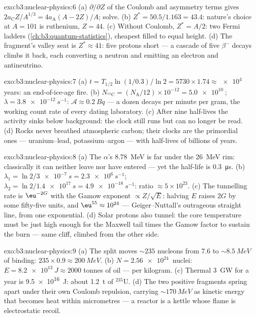 \begin{solution}{exo:b3:nuclear-physics:6}
(a) $\partial/\partial Z$ of the Coulomb and asymmetry terms
gives $2a_{\text{C}}Z/A^{1/3} = 4a_{\text{A}}(A - 2Z)/A$; solve.
(b) $Z^* = 50.5/1.163 = 43.4$: nature's choice at $A = 101$ is
ruthenium, $Z = 44$. (c) Without Coulomb, $Z^* = A/2$: two Fermi
ladders (\cref{ch:b3:quantum-statistics}), cheapest filled to
equal height. (d) The fragment's valley seat is $Z^* \approx 41$:
five protons short --- a cascade of five $\beta^-$ decays climbs
it back, each converting a neutron and emitting an electron and
antineutrino.
\end{solution}

\begin{solution}{exo:b3:nuclear-physics:7}
(a) $t = T_{1/2}\ln(1/0.3)/\ln2 = 5730\times1.74 \approx
\qty{e4}{}$ years: an end-of-ice-age fire. (b) $N_{^{14}\text{C}}
= (N_{\text{A}}/12)\times10^{-12} = \qty{5.0e10}{}$; $\lambda =
\qty{3.8e-12}{s^{-1}}$: $\mathcal A \approx \qty{0.2}{Bq}$ ---
a dozen decays per minute per gram, the working count rate of
every dating laboratory. (c) After nine half-lives the activity
sinks below background: the clock still runs but can no longer
be read. (d) Rocks never breathed atmospheric carbon; their
clocks are the primordial ones --- uranium--lead,
potassium--argon --- with half-lives of billions of years.
\end{solution}

\begin{solution}{exo:b3:nuclear-physics:8}
(a) The $\alpha$'s \qty{8.78}{MeV} is far under the
\qty{26}{MeV} rim: classically it can neither leave nor have
entered --- yet the half-life is \qty{0.3}{\micro s}. (b)
$\lambda_1 = \ln2/\qty{3e-7}{s} = \qty{2.3e6}{s^{-1}}$;
$\lambda_2 = \ln2/\qty{1.4e17}{s} = \qty{4.9e-18}{s^{-1}}$:
ratio $\approx 5\times10^{23}$. (c) The tunnelling rate is
$\eu^{-2G}$ with the Gamow exponent $\propto Z/\sqrt E$:
halving $E$ raises $2G$ by some fifty-five units, and
$\eu^{55} \approx 10^{24}$ --- Geiger--Nuttall's outrageous
straight line, from one exponential. (d) Solar protons also
tunnel: the core temperature must be just high enough for the
Maxwell tail times the Gamow factor to sustain the burn ---
same cliff, climbed from the other side.
\end{solution}

\begin{solution}{exo:b3:nuclear-physics:9}
(a) The split moves ${\sim}235$ nucleons from \qty{7.6}{} to
${\sim}\qty{8.5}{MeV}$ of binding: $235\times0.9 \approx
\qty{200}{MeV}$. (b) $N = \qty{2.56e24}{}$ nuclei:
$E = \qty{8.2e13}{J} \approx 2000$ tonnes of oil --- per
kilogram. (c) Thermal \qty{3}{GW} for a year is
\qty{9.5e16}{J}: about \qty{1.2}{t} of $^{235}$U. (d) The two
positive fragments spring apart under their own Coulomb
repulsion, carrying ${\sim}\qty{170}{MeV}$ as kinetic energy
that becomes heat within micrometres --- a reactor is a kettle
whose flame is electrostatic recoil.
\end{solution}

